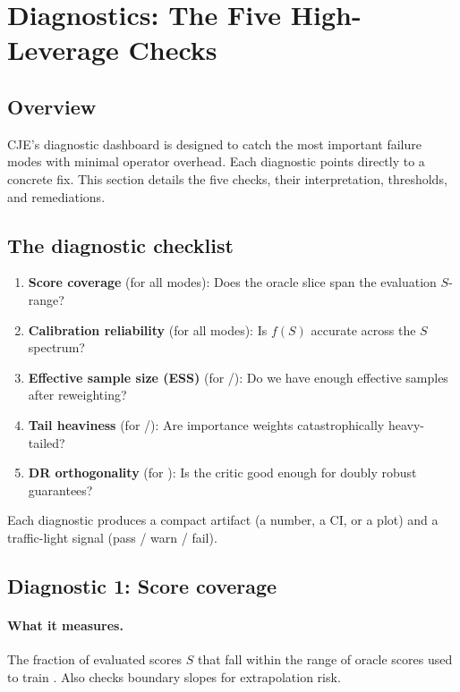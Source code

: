 \section{Diagnostics: The Five High-Leverage Checks}

\subsection{Overview}

CJE's diagnostic dashboard is designed to catch the most important failure modes with minimal operator overhead. Each diagnostic points directly to a concrete fix. This section details the five checks, their interpretation, thresholds, and remediations.

\subsection{The diagnostic checklist}

\begin{enumerate}
\item \textbf{Score coverage} (for all modes): Does the oracle slice span the evaluation $S$-range?
\item \textbf{Calibration reliability} (for all modes): Is $f(S)$ accurate across the $S$ spectrum?
\item \textbf{Effective sample size (ESS)} (for \ips/\dr): Do we have enough effective samples after reweighting?
\item \textbf{Tail heaviness} (for \ips/\dr): Are importance weights catastrophically heavy-tailed?
\item \textbf{DR orthogonality} (for \dr): Is the critic good enough for doubly robust guarantees?
\end{enumerate}

Each diagnostic produces a compact artifact (a number, a CI, or a plot) and a traffic-light signal (pass / warn / fail).

\subsection{Diagnostic 1: Score coverage}

\paragraph{What it measures.} The fraction of evaluated scores $S$ that fall within the range of oracle scores used to train \autocal. Also checks boundary slopes for extrapolation risk.


